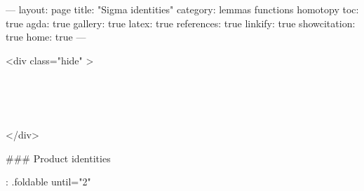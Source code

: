 ---
layout: page
title: "Sigma identities"
category: lemmas functions homotopy
toc: true
agda: true
gallery: true
latex: true
references: true
linkify: true
showcitation: true
home: true
---

<div class="hide" >
\begin{code}%
\>[0]\AgdaSymbol{\{-\#}\AgdaSpace{}%
\AgdaSpace{}%
\AgdaSpace{}%
\AgdaSymbol{\#-\}}\<%
\\
\>[0]\AgdaSpace{}%
\AgdaSpace{}%
\<%
\\
\>[0]\AgdaSpace{}%
\AgdaSpace{}%
\<%
\\
\>[0]\AgdaSpace{}%
\AgdaSpace{}%
\<%
\end{code}
</div>

### Product identities

{: .foldable until="2"}
\begin{code}%
\>[0]\<%
\\
\>[0][@{}l@{\AgdaIndent{0}}]%
\>[2]\<%
\\
%
\>[2]\<%
\\
\>[0]\<%
\end{code}


\begin{code}%
\>[0]\AgdaSpace{}%
\AgdaSpace{}%
\AgdaSymbol{\{}\AgdaSpace{}%
\AgdaSymbol{:}\AgdaSpace{}%
\AgdaSpace{}%
\AgdaSymbol{\}}\AgdaSpace{}%
\AgdaSymbol{\{}\AgdaSpace{}%
\AgdaSymbol{:}\AgdaSpace{}%
\AgdaSpace{}%
\AgdaSymbol{\}}\AgdaSpace{}%
\<%
\end{code}


